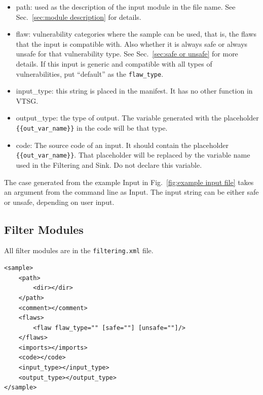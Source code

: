 \documentclass[12pt]{article}
\begin{document}
\begin{itemize}
    \item path: used as the description of the input module in the file name.
      See Sec.~\ref{sec:module description} for details.
    
    \item flaw: vulnerability categories where the sample can be used, that is, the
      flaws that the input is compatible with.  Also whether it is always safe or
      always unsafe for that vulnerability type.  See Sec.~\ref{sec:safe or unsafe}
      for more details.  If this input is generic and compatible with all
      types of vulnerabilities, put ``default'' as the \verb|flaw_type|.

    \item input\_type: this string is placed in the manifest.  It has no other
      function in VTSG.

    \item output\_type: the type of output.  The variable generated with the
      placeholder \\ \verb|{{out_var_name}}| in the code will be that type.

    \item code: The source code of an input. It should contain the placeholder \\
      \verb|{{out_var_name}}|.  That placeholder will be replaced by the variable
      name used in the Filtering and Sink.  Do not declare this variable.
\end{itemize}

The case generated from the example Input in 
Fig.~\ref{fig:example input file}
takes an argument from the command line as Input.  
The input string can be either safe or unsafe, depending on user input.

\subsection{Filter Modules}

All filter modules are in the \verb|filtering.xml| file.

\begin{verbatim}
<sample>
    <path>
        <dir></dir>
    </path>
    <comment></comment>
    <flaws>
        <flaw flaw_type="" [safe=""] [unsafe=""]/>
    </flaws>
    <imports></imports>
    <code></code>
    <input_type></input_type>
    <output_type></output_type>
</sample>
\end{verbatim}
\end{document}
